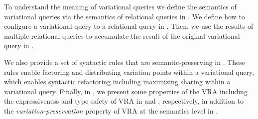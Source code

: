 To understand the meaning of variational queries
we define the semantics of variational queries via the
semantics of relational queries in . We define
how to configure a variational query to a relational query
in . Then, we use the results of multiple relational
queries to accumulate the result of the original variational query 
in .


%
We also provide 
a set of syntactic rules that are semantic-preserving 
in . These rules enable factoring and distributing
variation points within a variational query, which enables syntactic refactoring
including maximizing sharing within a variational query.
%
Finally, in , we present some properties of the VRA including
the expressiveness and type safety of VRA in  and , respectively,
in addition to the \emph{variation-preservation} property of VRA at the
semantics level in .



%









